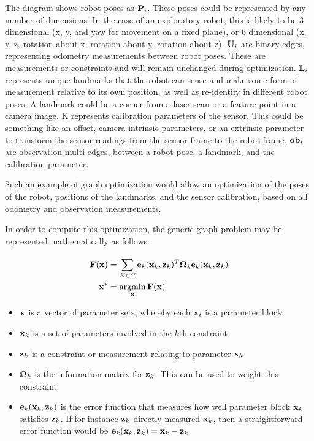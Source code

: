 The diagram shows robot poses as $\mathbf P_i$.  These poses could be represented by any number of dimensions. In the case of an exploratory robot, this is likely to be 3 dimensional (x, y, and yaw for movement on a fixed plane), or 6 dimensional (x, y, z, rotation about x, rotation about y, rotation about z).  $\mathbf U_i$ are binary edges, representing odometry measurements between robot poses. These are measurements or constraints and will remain unchanged during optimization.  $\mathbf L_i$ represents unique landmarks that the robot can sense and make some form of measurement relative to its own position, as well as re-identify in different robot poses.  A landmark could be a corner from a laser scan or a feature point in a camera image.  K represents calibration parameters of the sensor.  This could be something like an offset, camera intrinsic parameters, or an extrinsic parameter to transform the sensor readings from the sensor frame to the robot frame.  $\mathbf {ob}_i$ are observation multi-edges, between a robot pose, a landmark, and the calibration parameter.

Such an example of graph optimization would allow an optimization of the poses of the robot, positions of the landmarks, and the sensor calibration, based on all odometry and observation measurements.

In order to compute this optimization, the generic graph problem may be represented mathematically as follows:

 \begin{align}
   \bv{F}(\bv x) &= \sum\limits_{K \in C}^{} 
                 \bv e_k(\bv x_k, \bv z_k)^T 
                 \bv \Omega_k
                 \bv e_k(\bv x_k, \bv z_k)  \\ 
   \bv x^* &= \operatornamewithlimits{argmin}\limits_{\bv x}\bv{F}(\bv x)
 \end{align}

\begin{itemize}
 \item $\mathbf x$ is a vector of parameter sets, whereby each $\mathbf x_i$ is a parameter block
 \item $\mathbf x_k$ is a set of parameters involved in the $k$th constraint
 \item $\mathbf z_k$ is a constraint or measurement relating to parameter $\mathbf x_k$
 \item $\mathbf \Omega_k$ is the information matrix for $\mathbf z_k$.  This can be used to weight this constraint
 \item $\mathbf e_k(\mathbf x_k, \mathbf z_k)$ is the error function that measures how well parameter block $\mathbf x_k$ satisfies $\mathbf z_k$.  If for instance $\mathbf z_k$ directly measured $\mathbf x_k$, then a straightforward error function would be $\mathbf e_k(\mathbf x_k, \mathbf z_k) = \mathbf x_k - \mathbf z_k $
\end{itemize}

